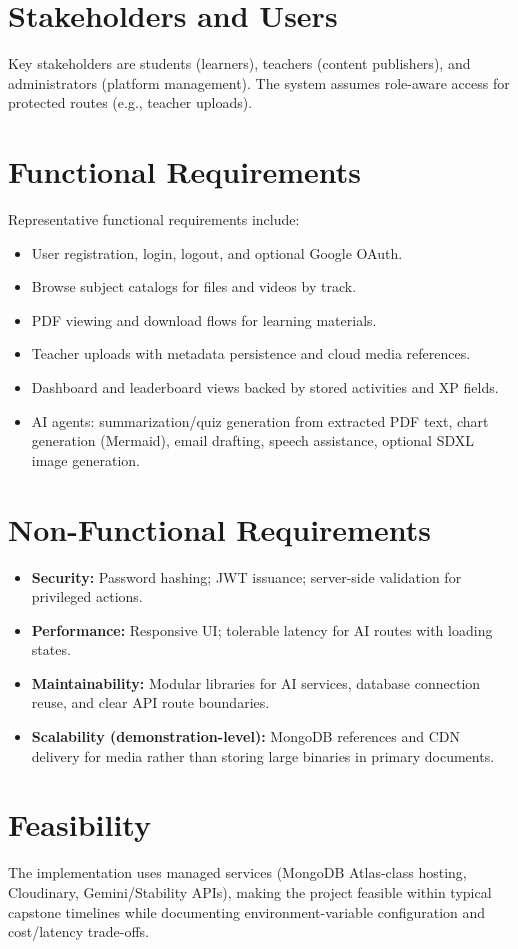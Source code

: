 \documentclass[a4paper,12pt,openany]{report}
\begin{document}
\section{Stakeholders and Users}
Key stakeholders are students (learners), teachers (content publishers), and administrators (platform management). The system assumes role-aware access for protected routes (e.g., teacher uploads).

\section{Functional Requirements}
Representative functional requirements include:
\begin{itemize}[leftmargin=*]
\item User registration, login, logout, and optional Google OAuth.
\item Browse subject catalogs for files and videos by track.
\item PDF viewing and download flows for learning materials.
\item Teacher uploads with metadata persistence and cloud media references.
\item Dashboard and leaderboard views backed by stored activities and XP fields.
\item AI agents: summarization/quiz generation from extracted PDF text, chart generation (Mermaid), email drafting, speech assistance, optional SDXL image generation.
\end{itemize}

\section{Non-Functional Requirements}
\begin{itemize}[leftmargin=*]
\item \textbf{Security:} Password hashing; JWT issuance; server-side validation for privileged actions.
\item \textbf{Performance:} Responsive UI; tolerable latency for AI routes with loading states.
\item \textbf{Maintainability:} Modular libraries for AI services, database connection reuse, and clear API route boundaries.
\item \textbf{Scalability (demonstration-level):} MongoDB references and CDN delivery for media rather than storing large binaries in primary documents.
\end{itemize}

\section{Feasibility}
The implementation uses managed services (MongoDB Atlas-class hosting, Cloudinary, Gemini/Stability APIs), making the project feasible within typical capstone timelines while documenting environment-variable configuration and cost/latency trade-offs.
\end{document}
